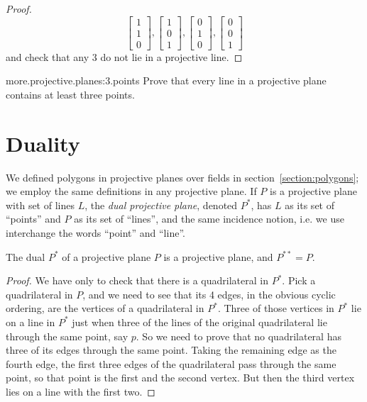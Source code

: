 \begin{proof}
\[
\begin{bmatrix}
1 \\
1 \\
0
\end{bmatrix}, 
\begin{bmatrix}
1 \\
0 \\
1
\end{bmatrix}, 
\begin{bmatrix}
0 \\
1 \\
0
\end{bmatrix}, 
\begin{bmatrix}
0 \\
0 \\
1
\end{bmatrix}
\]
and check that any 3 do not lie in a projective line.
\end{proof}


\begin{problem}{more.projective.planes:3.points}
Prove that every line in a projective plane contains at least three points.
\end{problem}



\section{Duality}
We defined polygons in projective planes over fields in section~\vref{section:polygons}; we employ the same definitions in any projective plane.
If \(P\) is a projective plane with set of lines \(L\), the \emph{dual projective plane}, denoted \(P^*\), has \(L\) as its set of ``points'' and \(P\) as its set of ``lines'', and the same incidence notion, i.e. we use interchange the words ``point'' and ``line''.

\begin{lemma}
The dual \(P^*\) of a projective plane \(P\) is a projective plane, and \(P^{**}=P\).
\end{lemma}
\begin{proof}
We have only to check that there is a quadrilateral in \(P^*\).
Pick a quadrilateral in \(P\), and we need to see that its 4 edges, in the obvious cyclic ordering, are the vertices of a quadrilateral in \(P^*\).
Three of those vertices in \(P^*\) lie on a line in \(P^*\) just when three of the lines of the original quadrilateral lie through the same point, say \(p\).
So we need to prove that no quadrilateral has three of its edges 
through the same point.
Taking the remaining edge as the fourth edge, the first three edges of the quadrilateral pass through the same point, so that point is the first and the second vertex.
But then the third vertex lies on a line with the first two.
\end{proof}

